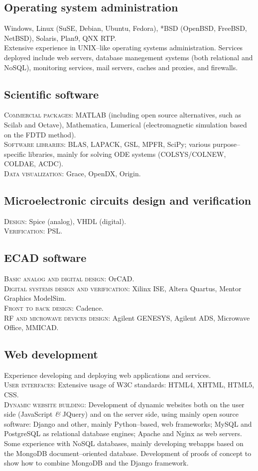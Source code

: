 \documentclass[11pt, a4paper]{article}
\newcommand{\amper}
           {{\fontspec[Scale=.95]
                      {Adobe Caslon Pro}\selectfont\itshape\&}}
\begin{document}
\subsection*{Operating system administration}
\noindent
	Windows, Linux (SuSE, Debian, Ubuntu, Fedora), *BSD (OpenBSD, FreeBSD, NetBSD), Solaris, Plan9, QNX RTP.\\
	Extensive experience in UNIX--like operating systems administration. Services deployed include web servers, database manegement systems (both relational and NoSQL), monitoring services, mail servers, caches and proxies, and firewalls.
\subsection*{Scientific software}
\noindent
	\textsc{Commercial packages}: MATLAB (including open source alternatives, such as Scilab and Octave), Mathematica, Lumerical (electromagnetic simulation based on the FDTD method).\\
	\textsc{Software libraries}: BLAS, LAPACK, GSL, MPFR, SciPy; various purpose--specific libraries, mainly for solving ODE systems (COLSYS/COLNEW, COLDAE, ACDC).\\
	\textsc{Data visualization}: Grace, OpenDX, Origin.
\subsection*{Microelectronic circuits design and verification}
\noindent
	\textsc{Design}: Spice (analog), VHDL (digital).\\
	\textsc{Verification}: PSL.
\subsection*{ECAD software}
\noindent
	\textsc{Basic analog and digital design}: OrCAD.\\
	\textsc{Digital systems design and verification}: Xilinx ISE, Altera Quartus, Mentor Graphics ModelSim.\\
	\textsc{Front to back design}: Cadence.\\
	\textsc{RF and microwave devices design}: Agilent GENESYS, Agilent ADS, Microwave Office, MMICAD.
\subsection*{Web development}
\noindent
	Experience developing and deploying web applications and services.\\
	\textsc{User interfaces}: Extensive usage of W3C standards: HTML4, XHTML, HTML5, CSS.\\
	\textsc{Dynamic website building}: Development of dynamic websites both on the user side (JavaScript \amper{} JQuery) and on the server side, using mainly open source software: Django and other, mainly Python--based, web frameworks; MySQL and PostgreSQL as relational database engines; Apache and Nginx as web servers.\\
	Some experience with NoSQL databases, mainly developing webapps based on the MongoDB document--oriented database. Development of proofs of concept to show how to combine MongoDB and the Django framework.
\end{document}
